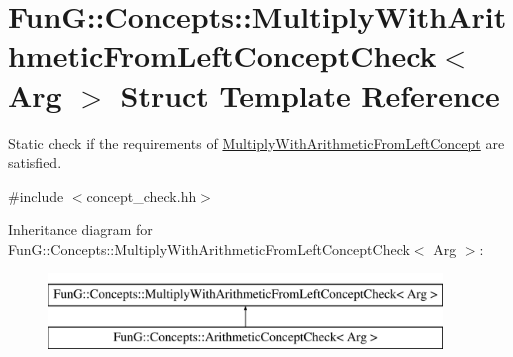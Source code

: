 \hypertarget{structFunG_1_1Concepts_1_1MultiplyWithArithmeticFromLeftConceptCheck}{\section{\-Fun\-G\-:\-:\-Concepts\-:\-:\-Multiply\-With\-Arithmetic\-From\-Left\-Concept\-Check$<$ \-Arg $>$ \-Struct \-Template \-Reference}
\label{structFunG_1_1Concepts_1_1MultiplyWithArithmeticFromLeftConceptCheck}
}


\-Static check if the requirements of \hyperlink{structFunG_1_1Concepts_1_1MultiplyWithArithmeticFromLeftConcept}{\-Multiply\-With\-Arithmetic\-From\-Left\-Concept} are satisfied.  




{\ttfamily \#include $<$concept\-\_\-check.\-hh$>$}

\-Inheritance diagram for \-Fun\-G\-:\-:\-Concepts\-:\-:\-Multiply\-With\-Arithmetic\-From\-Left\-Concept\-Check$<$ \-Arg $>$\-:\begin{figure}[H]
\begin{center}
\leavevmode
\includegraphics[height=2.000000cm]{structFunG_1_1Concepts_1_1MultiplyWithArithmeticFromLeftConceptCheck}
\end{center}
\end{figure}
